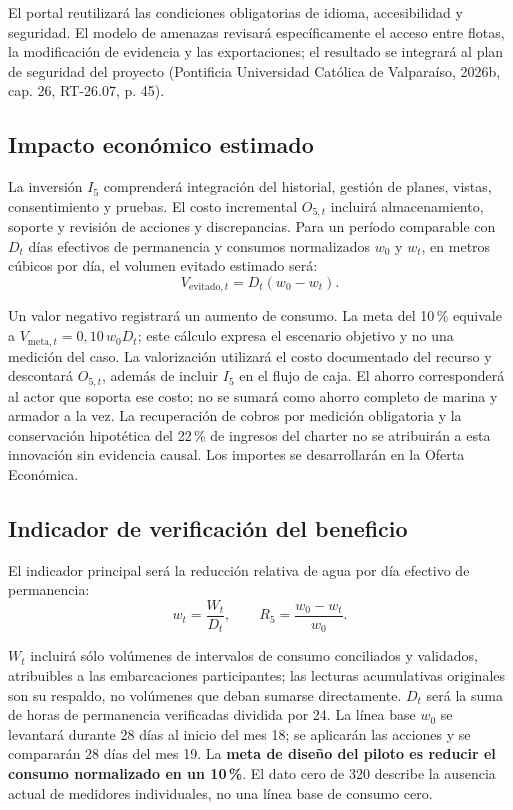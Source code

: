 El portal reutilizará las condiciones obligatorias de idioma,
accesibilidad y seguridad. El modelo de amenazas revisará
específicamente el acceso entre flotas, la modificación de
evidencia y las exportaciones; el resultado se integrará al
plan de seguridad del proyecto (Pontificia Universidad Católica
de Valparaíso, 2026b, cap. 26, RT-26.07, p. 45).

\subsection{Impacto económico estimado}

La inversión \(I_5\) comprenderá integración del historial, gestión de planes, vistas, consentimiento y pruebas. El costo incremental \(O_{5,t}\) incluirá almacenamiento, soporte y revisión de acciones y discrepancias. Para un período comparable con \(D_t\) días efectivos de permanencia y consumos normalizados \(w_0\) y \(w_t\), en metros cúbicos por día, el volumen evitado estimado será:
\[
  V_{\mathrm{evitado},t}=D_t(w_0-w_t).
\]

Un valor negativo registrará un aumento de consumo. La meta del 10\,\% equivale a \(V_{\mathrm{meta},t}=0{,}10\,w_0D_t\); este cálculo expresa el escenario objetivo y no una medición del caso. La valorización utilizará el costo documentado del recurso y descontará \(O_{5,t}\), además de incluir \(I_5\) en el flujo de caja. El ahorro corresponderá al actor que soporta ese costo; no se sumará como ahorro completo de marina y armador a la vez. La recuperación de cobros por medición obligatoria y la conservación hipotética del 22\,\% de ingresos del charter no se atribuirán a esta innovación sin evidencia causal. Los importes se desarrollarán en la Oferta Económica.

\subsection{Indicador de verificación del beneficio}

El indicador principal será la reducción relativa de agua por día efectivo de permanencia:
\[
  w_t=\frac{W_t}{D_t},\qquad
  R_5=\frac{w_0-w_t}{w_0}.
\]

\(W_t\) incluirá sólo volúmenes de intervalos de consumo conciliados y validados, atribuibles a las embarcaciones participantes; las lecturas acumulativas originales son su respaldo, no volúmenes que deban sumarse directamente. \(D_t\) será la suma de horas de permanencia verificadas dividida por 24. La línea base \(w_0\) se levantará durante 28 días al inicio del mes 18; se aplicarán las acciones y se compararán 28 días del mes 19. La \textbf{meta de diseño del piloto es reducir el consumo normalizado en un 10\,\%}. El dato cero de 320 describe la ausencia actual de medidores individuales, no una línea base de consumo cero.

